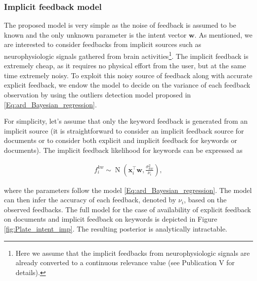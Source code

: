 \documentclass[dissertation,math,vertlayout,pdfa,colorlinks]{aaltoseries}
\newcommand{\bw}{\bm{w}}
\DeclareMathOperator{\normalpdf}{N}
\newcommand{\tp}{^{\top}}
\begin{document}
\subsubsection{Implicit feedback model}

The proposed model is very simple as the noise of feedback is assumed to be known and the only unknown parameter is the intent vector $\bw$. As mentioned, we are interested to consider feedbacks from implicit sources such as neurophysiologic signals gathered from brain activities\footnote{Here we assume that the implicit feedbacks from neurophysiologic signals are already converted to a continuous relevance value (see Publication V for details).}. The implicit feedback is extremely cheap, as it requires no physical effort from the user, but at the same time extremely noisy. To exploit this noisy source of feedback along with accurate explicit feedback, we endow the model to decide on the variance of each feedback observation by using the outliers detection model proposed in \ref{Eq:ard_Bayesian_regression}. %

For simplicity, let's assume that only the keyword feedback is generated from an implicit source (it is straightforward to consider an implicit feedback source for documents or to consider both explicit and implicit feedback for keywords or documents). The implicit feedback likelihood for keywords can be expressed as 

\begin{align}\label{Eq:imp_fb_on_kw} 
f_{i}^{kw} \sim \normalpdf(\bm{x}_i\tp\bw,\frac{\sigma_{kw}^2}{\nu_i}),
\end{align}  

\noindent where the parameters follow the model \ref{Eq:ard_Bayesian_regression}. The model can then infer the accuracy of each feedback, denoted by $\nu_i$, based on the observed feedbacks. The full model for the case of availability of explicit feedback on documents and implicit feedback on keywords is depicted in Figure \ref{fig:Plate_intent_imp}. The resulting posterior is analytically intractable.  
\end{document}
